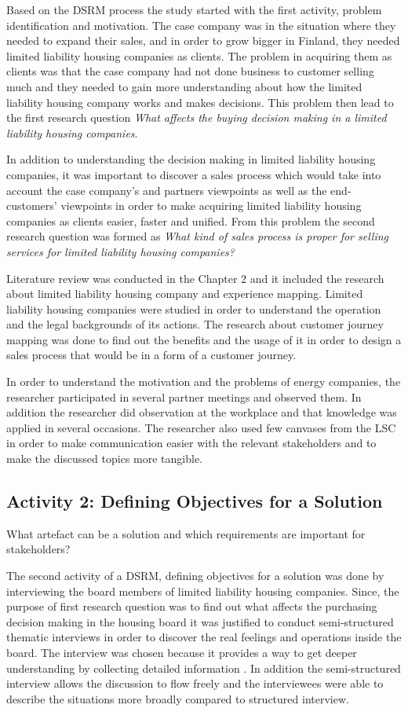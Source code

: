 Based on the DSRM process the study started with the first activity, problem identification and motivation. The case company was in the situation where they needed to expand their sales, and in order to grow bigger in Finland, they needed limited liability housing companies as clients. The problem in acquiring them as clients was that the case company had not done business to customer selling much and they needed to gain more understanding about how the limited liability housing company works and makes decisions. This problem then lead to the first research question \emph{What affects the buying decision making in a limited liability housing companies}.

In addition to understanding the decision making in limited liability housing companies, it was important to discover a sales process which would take into account the case company's and partners viewpoints as well as the end-customers' viewpoints in order to make acquiring limited liability housing companies as clients easier, faster and unified. From this problem the second research question was formed as \emph{What kind of sales process is proper for selling services for limited liability housing companies?}

Literature review was conducted in the Chapter 2 and it included  the research about limited liability housing company and experience mapping. Limited liability housing companies were studied in order to understand the operation and the legal backgrounds of its actions. The research about customer journey mapping was done to find out the benefits and the usage of it in order to design a sales process that would be in a form of a customer journey.

In order to understand the motivation and the problems of energy companies, the researcher participated in several partner meetings and observed them. In addition the researcher did observation at the workplace and that knowledge was applied in several occasions. The researcher also used few canvases from the LSC in order to make communication easier with the relevant stakeholders and to make the discussed topics more tangible.

\subsection{Activity 2: Defining Objectives for a Solution}
What artefact can be a solution and which requirements are important for stakeholders?

The second activity of a DSRM, defining objectives for a solution was done by interviewing the board members of limited liability housing companies. Since, the purpose of first research question was to find out what affects the purchasing decision making in the housing board it was justified to conduct semi-structured thematic interviews in order to discover the real feelings and operations inside the board. The interview was chosen because it provides a way to get deeper understanding by collecting detailed information \parencite{Johannesson:2014}. In addition the semi-structured interview allows the discussion to flow freely and the interviewees were able to describe the situations more broadly compared to structured interview.


